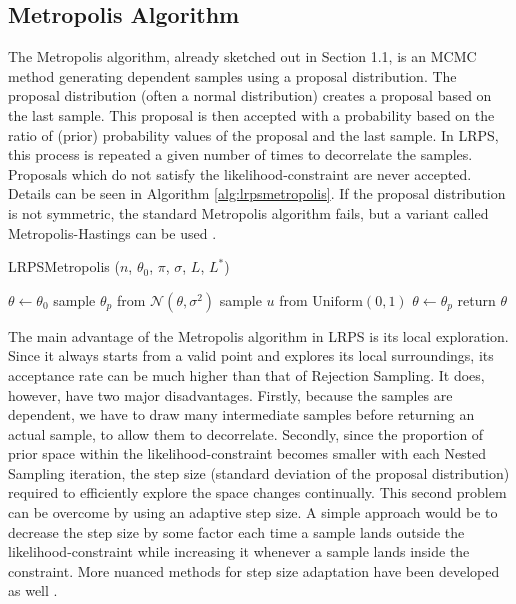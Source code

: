 \documentclass[12pt, a4paper]{report}
\begin{document}
\subsection{Metropolis Algorithm}
The Metropolis algorithm, already sketched out in Section 1.1, is an MCMC method generating dependent samples using a proposal distribution.
The proposal distribution (often a normal distribution) creates a proposal based on the last sample.
This proposal is then accepted with a probability based on the ratio of (prior) probability values of the proposal and the last sample.
In LRPS, this process is repeated a given number of times to decorrelate the samples.
Proposals which do not satisfy the likelihood-constraint are never accepted.
Details can be seen in Algorithm \ref{alg:lrpsmetropolis}.
If the proposal distribution is not symmetric, the standard Metropolis algorithm fails, but a variant called Metropolis-Hastings can be used \cite[p. 365f.]{mckay}.
\begin{algorithm}
    \caption[Likelihood-restricted prior sampling using Metropolis.]{LRPSMetropolis ($n$, $\theta_0$, $\pi$, $\sigma$, $L$, $L^*$)}
    \label{alg:lrpsmetropolis}
    \begin{algorithmic}
        \State $\theta \gets \theta_0$
            \State sample $\theta_p$ from $\mathcal{N}(\theta, \sigma^2)$
            \State sample $u$ from $\textrm{Uniform}(0, 1)$
                \State $\theta \gets \theta_p$
            \EndIf
        \EndFor
        \State return $\theta$
    \end{algorithmic}
\end{algorithm}

The main advantage of the Metropolis algorithm in LRPS is its local exploration.
Since it always starts from a valid point and explores its local surroundings, its acceptance rate can be much higher than that of Rejection Sampling.
It does, however, have two major disadvantages.
Firstly, because the samples are dependent, we have to draw many intermediate samples before returning an actual sample, to allow them to decorrelate.
Secondly, since the proportion of prior space within the likelihood-constraint becomes smaller with each Nested Sampling iteration, the step size (standard deviation of the proposal distribution) required to efficiently explore the space changes continually.
This second problem can be overcome by using an adaptive step size.
A simple approach would be to decrease the step size by some factor each time a sample lands outside the likelihood-constraint while increasing it whenever a sample lands inside the constraint.
More nuanced methods for step size adaptation have been developed as well \cite{automala}.
\end{document}
